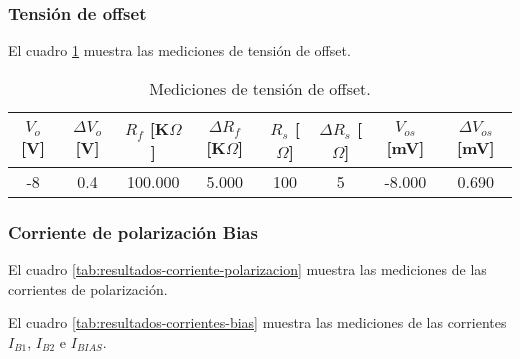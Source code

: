 
\subsubsection{Tensión de offset}

El cuadro \ref{tab:resultados-tension-offset} muestra las mediciones de tensión de offset.

\begin{table}[h!]
\centering
\begin{tabular}{|c|c|c|c|c|c|c|c|}
\hline
$V_o$ [V] & $\Delta V_o$ [V] & $R_f$ [K$\Omega$] & $\Delta R_f$ [K$\Omega$] & $R_s$ [$\Omega$] & $\Delta R_s$ [$\Omega$] & $V_{os}$ [mV] & $\Delta V_{os}$ [mV] \\ \hline
-8 & 0.4 & 100.000 & 5.000 & 100 & 5 & -8.000 & 0.690 \\ \hline
\end{tabular}
\caption{Mediciones de tensión de offset.}
\label{tab:resultados-tension-offset}
\end{table}

\subsubsection{Corriente de polarización Bias}

El cuadro \ref{tab:resultados-corriente-polarizacion} muestra las mediciones de las corrientes de polarización.

\begin{table}[h!]
\centering
{}
\caption{Mediciones de corriente de polarización.}
\label{tab:resultados-corriente-polarizacion}
\end{table}

El cuadro \ref{tab:resultados-corrientes-bias} muestra las mediciones de las corrientes $I_{B1}$, $I_{B2}$ e $I_{BIAS}$.


